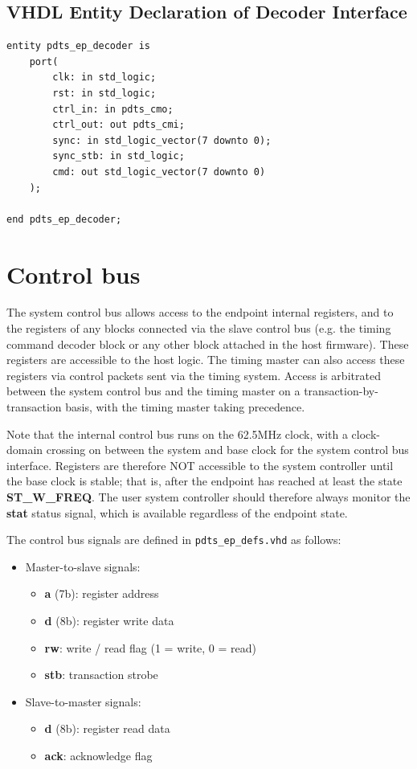 \documentclass{article}
\begin{document}
\subsection{VHDL Entity Declaration of Decoder Interface}

\begin{verbatim}
entity pdts_ep_decoder is
    port(
        clk: in std_logic;
        rst: in std_logic;
        ctrl_in: in pdts_cmo;
        ctrl_out: out pdts_cmi;
        sync: in std_logic_vector(7 downto 0);
        sync_stb: in std_logic;
        cmd: out std_logic_vector(7 downto 0)
    );

end pdts_ep_decoder;
\end{verbatim}


\section{Control bus}

The system control bus allows access to the endpoint internal
registers, and to the registers of any blocks connected via the slave
control bus (e.g. the timing command decoder block or any other block
attached in the host firmware). These registers are accessible to the
host logic. The timing master can also access these registers via
control packets sent via the timing system. Access is arbitrated
between the system control bus and the timing master on a
transaction-by-transaction basis, with the timing master taking
precedence.

Note that the internal control bus runs on the 62.5MHz clock, with a
clock-domain crossing on between the system and base clock for the
system control bus interface. Registers are therefore NOT accessible
to the system controller until the base clock is stable; that is,
after the endpoint has reached at least the state
\textbf{ST\_W\_FREQ}. The user system controller should therefore
always monitor the \textbf{stat} status signal, which is available
regardless of the endpoint state.

The control bus signals are defined in \texttt{pdts\_ep\_defs.vhd} as follows:

\begin{itemize}
\item Master-to-slave signals:
\begin{itemize}
\item \textbf{a} (7b): register address
\item \textbf{d} (8b): register write data
\item \textbf{rw}: write / read flag (1 = write, 0 = read)
\item \textbf{stb}: transaction strobe
\end{itemize}

\item Slave-to-master signals:
\begin{itemize}
\item \textbf{d} (8b): register read data
\item \textbf{ack}: acknowledge flag
\end{itemize}

\end{itemize}
\end{document}
